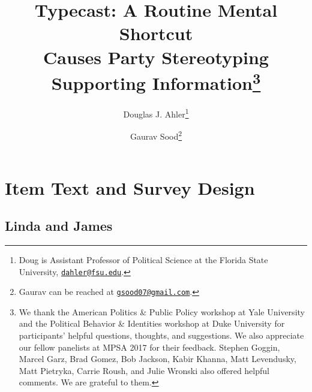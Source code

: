 \documentclass[12pt, letterpaper]{article}
\title{Typecast: A Routine Mental Shortcut \\ Causes Party Stereotyping \\ \vspace{2in} Supporting Information\footnote{We thank the American Politics \& Public Policy workshop at Yale University and the Political Behavior \& Identities workshop at Duke University for participants' helpful questions, thoughts, and suggestions. We also appreciate our fellow panelists at MPSA 2017 for their feedback. Stephen Goggin, Marcel Garz, Brad Gomez, Bob Jackson, Kabir Khanna, Matt Levendusky, Matt Pietryka, Carrie Roush, and Julie Wronski also offered helpful comments. We are grateful to them.}}
\author{Douglas J. Ahler\thanks{Doug is Assistant Professor of Political Science at the Florida State University, \href{mailto:dahler@fsu.edu}{\texttt{dahler@fsu.edu}}.} \and Gaurav Sood\thanks{Gaurav can be reached at \href{mailto:gsood07@gmail.com}{\texttt{gsood07@gmail.com}}.}}
\begin{document}
\maketitle

\newpage
\doublespacing

\renewcommand{\thesection}{SI \arabic{section}}
\renewcommand\thetable{\thesection.\arabic{table}}  
\renewcommand\thefigure{\thesection.\arabic{figure}}

\section{Item Text and Survey Design}

\subsection{Linda and James}
\end{document}
